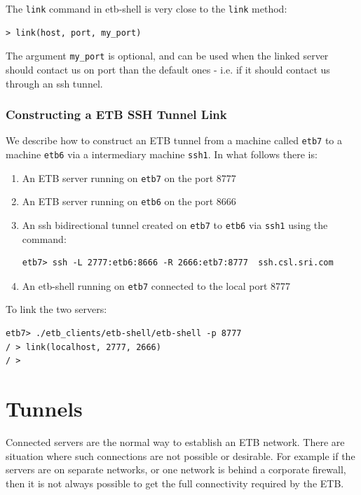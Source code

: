 \documentclass{article}
\begin{document}
{The {\tt link} command in etb-shell is very close to the {\tt link} method:
\begin{verbatim}
> link(host, port, my_port)
\end{verbatim}
The argument {\tt my\_port} is optional, and can be used when the
linked server should contact us on port than the default ones - i.e.
if it should contact us through an ssh tunnel.

\subsubsection{Constructing a ETB SSH Tunnel Link}


We describe how to construct an ETB tunnel from a machine called {\tt etb7}
to a machine {\tt etb6} via a intermediary machine {\tt ssh1}. 
In what follows there is:

\begin{enumerate}
\item An ETB server running on {\tt  etb7} on the port 8777

\item An ETB server running on {\tt etb6} on the port 8666

\item An ssh bidirectional tunnel created on {\tt etb7} to {\tt etb6} via {\tt ssh1} using
the command:

\begin{verbatim}
etb7> ssh -L 2777:etb6:8666 -R 2666:etb7:8777  ssh.csl.sri.com
\end{verbatim}

\item An etb-shell running on  {\tt etb7} connected to the local port 8777

\end{enumerate}


To link the two servers:

\begin{verbatim}
etb7> ./etb_clients/etb-shell/etb-shell -p 8777
/ > link(localhost, 2777, 2666)
/ > 
\end{verbatim}
}


\section{Tunnels}

Connected servers are the normal way to establish an ETB network.
There are situation where such connections are not possible or
desirable. For example if the servers are on separate networks, or
one network is behind a corporate firewall, then it is
not always possible to get the full connectivity required by the ETB.
\end{document}
